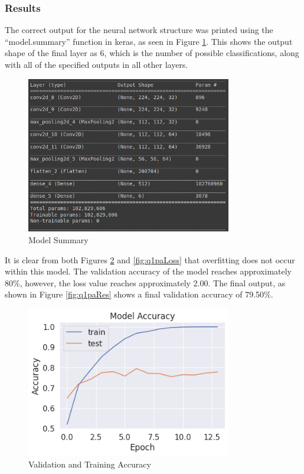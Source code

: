 \subsubsection{Results}

The correct output for the neural network structure was printed using the
``model.summary'' function in keras, as seen in Figure \ref{fig:q1paModSum}.
This shows the output shape of the final layer as 6, which is the number of
possible classifications, along with all of the specified outputs in all other
layers.

\begin{figure}[H]
	\centering
	\includegraphics[width=0.8\textwidth]{images/q1/pa/q1pamodel}
	\caption{Model Summary}
	\label{fig:q1paModSum}
\end{figure}

It is clear from both Figures \ref{fig:q1paAcc} and \ref{fig:q1paLoss} that
overfitting does not occur within this model. The validation accuracy of the
model reaches approximately 80\%, however, the loss value reaches approximately
2.00. The final output, as shown in Figure \ref{fig:q1paRes} shows a final
validation accuracy of 79.50\%.

\begin{figure}[H]
	\centering
	\includegraphics[width=0.8\textwidth]{images/q1/pa/accuracy}
	\caption{Validation and Training Accuracy}
	\label{fig:q1paAcc}
\end{figure}

